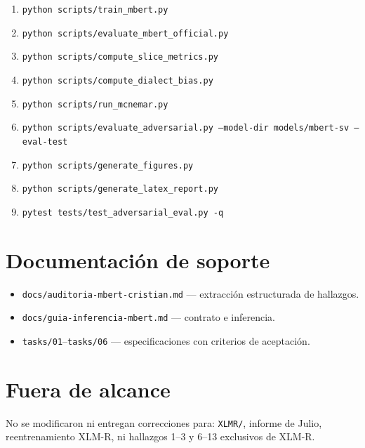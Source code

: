\begin{enumerate}[noitemsep]
  \item \texttt{python scripts/train\_mbert.py}
  \item \texttt{python scripts/evaluate\_mbert\_official.py}
  \item \texttt{python scripts/compute\_slice\_metrics.py}
  \item \texttt{python scripts/compute\_dialect\_bias.py}
  \item \texttt{python scripts/run\_mcnemar.py}
  \item \texttt{python scripts/evaluate\_adversarial.py --model-dir models/mbert-sv --eval-test}
  \item \texttt{python scripts/generate\_figures.py}
  \item \texttt{python scripts/generate\_latex\_report.py}
  \item \texttt{pytest tests/test\_adversarial\_eval.py -q}
\end{enumerate}

\section{Documentación de soporte}

\begin{itemize}[noitemsep]
  \item \texttt{docs/auditoria-mbert-cristian.md} --- extracción estructurada de hallazgos.
  \item \texttt{docs/guia-inferencia-mbert.md} --- contrato e inferencia.
  \item \texttt{tasks/01}--\texttt{tasks/06} --- especificaciones con criterios de aceptación.
\end{itemize}

\section{Fuera de alcance}

No se modificaron ni entregan correcciones para: \texttt{XLMR/}, informe de Julio, reentrenamiento XLM-R, ni hallazgos 1--3 y 6--13 exclusivos de XLM-R.
